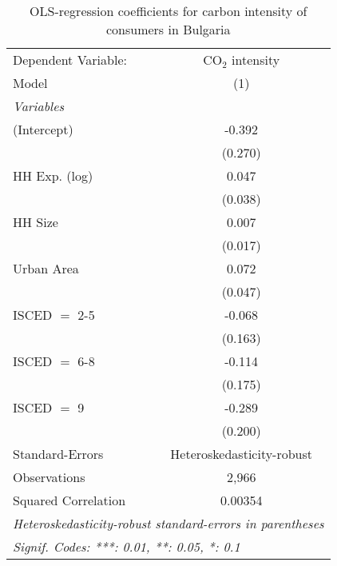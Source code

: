 
\begin{table}[htbp!]
   \centering
   \small
   \begin{adjustbox}{width = 1\textwidth, max height = 0.95\textheight, center}
      \begin{threeparttable}[b]
         \caption{\label{tab:OLS_1_BGR} OLS-regression coefficients for carbon intensity of consumers in Bulgaria}
         \begin{tabular}{lc}
            \tabularnewline \midrule \midrule
            Dependent Variable: & CO$_{2}$ intensity\\  
            Model               & (1)\\  
            \midrule
            \emph{Variables}\\
            (Intercept)         & -0.392\\   
                                & (0.270)\\   
            HH Exp. (log)       & 0.047\\   
                                & (0.038)\\   
            HH Size             & 0.007\\   
                                & (0.017)\\   
            Urban Area          & 0.072\\   
                                & (0.047)\\   
            ISCED $=$ 2-5       & -0.068\\   
                                & (0.163)\\   
            ISCED $=$ 6-8       & -0.114\\   
                                & (0.175)\\   
            ISCED $=$ 9         & -0.289\\   
                                & (0.200)\\   
            \midrule 
            Standard-Errors     & Heteroskedasticity-robust \\   
            Observations        & 2,966\\  
            Squared Correlation & 0.00354\\  
            \midrule \midrule
            \multicolumn{2}{l}{\emph{Heteroskedasticity-robust standard-errors in parentheses}}\\
            \multicolumn{2}{l}{\emph{Signif. Codes: ***: 0.01, **: 0.05, *: 0.1}}\\
         \end{tabular}
         

\end{threeparttable}
\end{adjustbox}
\end{table}

